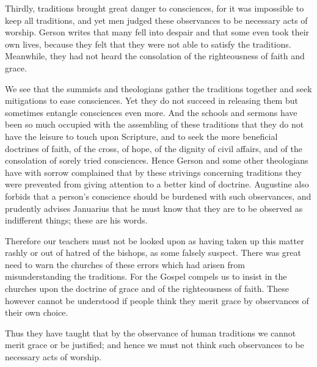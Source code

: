 Thirdly, traditions brought great danger to consciences, for it was impossible to keep all traditions, and yet men judged these observances to be necessary acts of worship. Gerson writes that many fell into despair and that some even took their own lives, because they felt that they were not able to satisfy the traditions. Meanwhile, they had not heard the consolation of the righteousness of faith and grace.

We see that the summists and theologians gather the traditions together and seek mitigations to ease consciences. Yet they do not succeed in releasing them but sometimes entangle consciences even more. And the schools and sermons have been so much occupied with the assembling of these traditions that they do not have the leisure to touch upon Scripture, and to seek the more beneficial doctrines of faith, of the cross, of hope, of the dignity of civil affairs, and of the consolation of sorely tried consciences. Hence Gerson and some other theologians have with sorrow complained that by these strivings concerning traditions they were prevented from giving attention to a better kind of doctrine. Augustine also forbids that a person’s conscience should be burdened with such observances, and prudently advises Januarius that he must know that they are to be observed as indifferent things; these are his words.

Therefore our teachers must not be looked upon as having taken up this matter rashly or out of hatred of the bishops, as some falsely suspect. There was great need to warn the churches of these errors which had arisen from misunderstanding the traditions. For the Gospel compels us to insist in the churches upon the doctrine of grace and of the righteousness of faith. These however cannot be understood if people think they merit grace by observances of their own choice.

Thus they have taught that by the observance of human traditions we cannot merit grace or be justified; and hence we must not think such observances to be necessary acts of worship.

